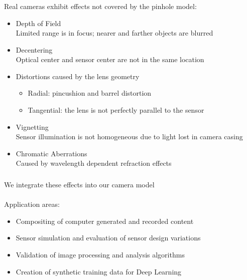 \documentclass[utf8,stillsansserifmath,fleqn,t]{beamer}
\begin{document}
\begin{frame}[label=camera-models]
\frametitle{\insertsection}
Real cameras exhibit effects not covered by the pinhole model:
\begin{itemize}
\item Depth of Field\\
    Limited range is in focus; nearer and farther objects are blurred
\item Decentering\\
    Optical center and sensor center are not in the same location
\item Distortions caused by the lens geometry
    \begin{itemize}
    \item Radial: pincushion and barrel distortion
    \item Tangential: the lens is not perfectly parallel to the sensor
    \end{itemize}
\item Vignetting\\
   Sensor illumination is not homogeneous due to light lost in camera casing
\item Chromatic Aberrations\\
    Caused by wavelength dependent refraction effects
\end{itemize}
\end{frame}

\begin{frame}
\frametitle{\insertsection}
We integrate these effects into our camera model\\
~\\
Application areas:
\begin{itemize}
\item Compositing of computer generated and recorded content
\item Sensor simulation and evaluation of sensor design variations
\item Validation of image processing and analysis algorithms
\item Creation of synthetic training data for Deep Learning
\end{itemize}
\end{frame}
\end{document}
